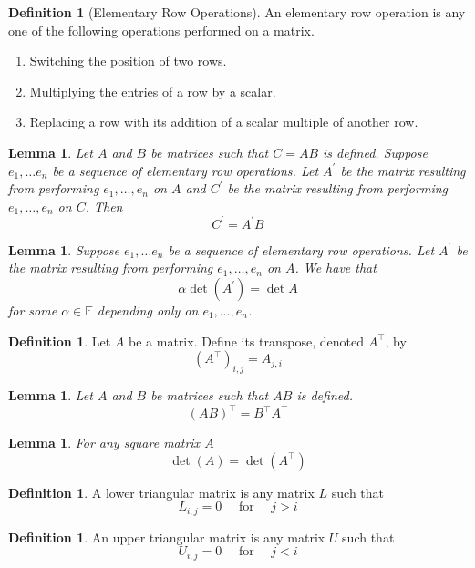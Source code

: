 \documentclass[12pt,letterpaper]{article}
\theoremstyle{plain}
\newtheorem{lemma}[theorem]{Lemma}
\theoremstyle{definition}
\newtheorem{definition}[theorem]{Definition}
\numberwithin{equation}{section}
\begin{document}
\begin{definition}[Elementary Row Operations]
An elementary row operation is any one of the following operations performed on a matrix. 
\begin{enumerate}[$\bullet$]
\item Switching the position of two rows.
\item Multiplying the entries of a row by a scalar.
\item Replacing a row with its addition of a scalar multiple of another row. 
\end{enumerate}
\end{definition} 
\begin{lemma}\label{ele prod}
Let $A$ and $B$ be matrices such that $C=AB$ is defined. Suppose $e_1, \ldots e_n$ be a sequence of elementary row operations. Let $A^\prime$ be the matrix resulting from performing $e_1,\ldots, e_n$ on $A$ and $C^\prime$ be the matrix resulting from performing $e_1, \ldots, e_n$ on $C$. Then 
\[C^\prime=A^\prime B\]
\end{lemma}

\begin{lemma}\label{det ele}
 Suppose $e_1, \ldots e_n$ be a sequence of elementary row operations. Let $A^\prime$ be the matrix resulting from performing $e_1,\ldots, e_n$ on $A$. We have that 
 \[\alpha\det(A^\prime)= \det{A}\]
 for some $\alpha\in \mathbb{F}$ depending only on $e_1,\ldots, e_n$. 
\end{lemma}

\begin{definition}
Let $A$ be a matrix. Define its transpose, denoted $A^\top$, by
\[(A^\top)_{i,j}=A_{j,i}\]
\end{definition}

\begin{lemma}
Let $A$ and $B$ be matrices such that $AB$ is defined. 
\[(AB)^\top=B^\top A^\top\]
\end{lemma}

\begin{lemma}\label{det trans}
For any square matrix $A$ 
\[\det(A)=\det(A^\top)\]
\end{lemma}


\begin{definition} A lower triangular matrix is any matrix $L$ such that 
\[L_{i,j}=0 \quad\text{ for }\quad j>i\]
\end{definition}

\begin{definition} An upper triangular matrix is any matrix $U$ such that 
\[U_{i,j}=0 \quad\text{ for }\quad j<i\]
\end{definition}
\end{document}

